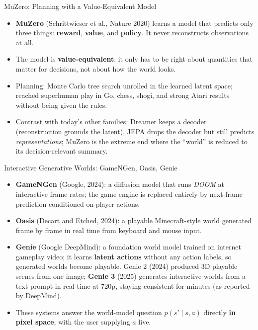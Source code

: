 \begin{frame}{MuZero: Planning with a Value-Equivalent Model}
  \begin{itemize}\itemsep0.28em
    \item \textbf{MuZero} (Schrittwieser et al., Nature 2020) learns a model that predicts only three things: \textbf{reward}, \textbf{value}, and \textbf{policy}. It never reconstructs observations at all.
    \item The model is \textbf{value-equivalent}: it only has to be right about quantities that matter for decisions, not about how the world looks.
    \item Planning: Monte Carlo tree search unrolled in the learned latent space; reached superhuman play in Go, chess, shogi, and strong Atari results without being given the rules.
    \item Contrast with today's other families: Dreamer keeps a decoder (reconstruction grounds the latent), JEPA drops the decoder but still predicts \emph{representations}; MuZero is the extreme end where the ``world'' is reduced to its decision-relevant summary.
  \end{itemize}
\end{frame}

\begin{frame}{Interactive Generative Worlds: GameNGen, Oasis, Genie}
  \begin{itemize}\itemsep0.26em
    \item \textbf{GameNGen} (Google, 2024): a diffusion model that runs \emph{DOOM} at interactive frame rates; the game engine is replaced entirely by next-frame prediction conditioned on player actions.
    \item \textbf{Oasis} (Decart and Etched, 2024): a playable Minecraft-style world generated frame by frame in real time from keyboard and mouse input.
    \item \textbf{Genie} (Google DeepMind): a foundation world model trained on internet gameplay video; it learns \textbf{latent actions} without any action labels, so generated worlds become playable. Genie 2 (2024) produced 3D playable scenes from one image; \textbf{Genie 3} (2025) generates interactive worlds from a text prompt in real time at 720p, staying consistent for minutes (as reported by DeepMind).
    \item These systems answer the world-model question $p(s' \mid s, a)$ directly \textbf{in pixel space}, with the user supplying $a$ live.
  \end{itemize}
\end{frame}

